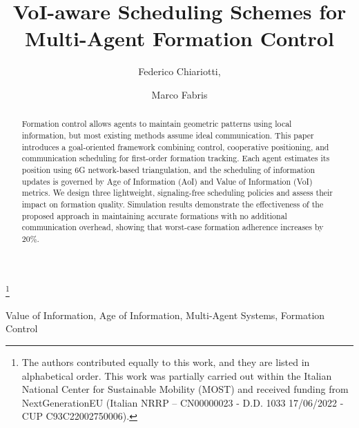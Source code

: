 \documentclass{ifac/ifacconf}
\begin{document}
\begin{frontmatter}

\title{VoI-aware Scheduling Schemes for Multi-Agent Formation Control}


\thanks[footnoteinfo]{The authors contributed equally to this work, and they are listed in alphabetical order. This work was partially carried out within the Italian National Center for Sustainable Mobility (MOST) and received funding from NextGenerationEU (Italian NRRP – CN00000023 - D.D. 1033 17/06/2022 - CUP C93C22002750006).}

\author{Federico Chiariotti,} 
\author{Marco Fabris} 

\address{Department of Information Engineering, University of Padova, 
   Italy\\(e-mail: federico.chiariotti@unipd.it, marco.fabris.1@unipd.it).}

\begin{abstract}                %
Formation control allows agents to maintain geometric patterns using local information, but most existing methods assume ideal communication. This paper introduces a goal-oriented framework combining control, cooperative positioning, and communication scheduling for first-order formation tracking. Each agent estimates its position using 6G network-based triangulation, and the scheduling of information updates is governed by Age of Information (AoI) and Value of Information (VoI) metrics. We design three lightweight, signaling-free scheduling policies and assess their impact on formation quality. Simulation results demonstrate the effectiveness of the proposed approach in maintaining accurate formations with no additional communication overhead, showing that worst-case formation adherence increases by $20\%$.

\end{abstract}

\begin{keyword}
Value of Information, Age of Information, Multi-Agent Systems, Formation Control
\end{keyword}

\end{frontmatter}
\end{document}
